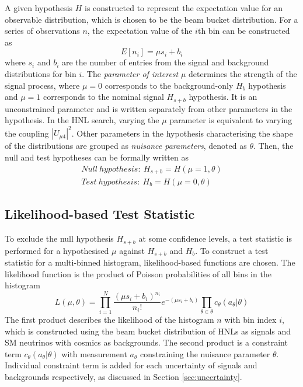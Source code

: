 A given hypothesis $H$ is constructed to represent the expectation value for an observable distribution, which is chosen to be the beam bucket distribution.
For a series of observations $n$, the expectation value of the $i$th bin can be constructed as 
\begin{equation}
    E[n_i] = \mu s_i + b_i    
\end{equation}
where $s_i$ and $b_i$ are the number of entries from the signal and background distributions for bin $i$.
The \textit{parameter of interest} $\mu$ determines the strength of the signal process, where $\mu = 0$ corresponds to the background-only $H_{b}$ hypothesis and $\mu = 1$ corresponds to the nominal signal $H_{s+b}$ hypothesis.
It is an unconstrained parameter and is written separately from other parameters in the hypothesis.
In the HNL search, varying the $\mu$ parameter is equivalent to varying the coupling $|U_{\mu4}|^{2}$.
Other parameters in the hypothesis characterising the shape of the distributions are grouped as \textit{nuisance parameters}, denoted as $\theta$.
Then, the null and test hypotheses can be formally written as
\begin{align}
    Null\ hypothesis:\ H_{s+b} = H (\mu = 1, \theta) \\
    Test\ hypothesis:\ H_{b} = H (\mu = 0, \theta)
\end{align}

\subsection{Likelihood-based Test Statistic}
\label{sec:llh_test}

To exclude the null hypothesis $H_{s+b}$ at some confidence levels, a test statistic is performed for a hypothesised $\mu$ against $H_{s+b}$ and $H_{b}$.
To construct a test statistic for a multi-binned histogram, likelihood-based functions are chosen.
The likelihood function is the product of Poisson probabilities of all bins in the histogram \cite{asymptotic_test}
\begin{equation}
\label{eq:LLH_func}
    L(\mu, \theta) =  \prod_{i=1}^{N} \frac{(\mu s_i + b_i)^{n_i}}{n_i!} e^{-(\mu s_i + b_i)}  \prod_{\theta\in\theta} c_\theta(a_\theta|\theta)
\end{equation}
The first product describes the likelihood of the histogram $n$ with bin index $i$, which is constructed using the beam bucket distribution of HNLs as signals and SM neutrinos with cosmics as backgrounds. 
The second product is a constraint term $c_\theta(a_\theta|\theta)$ with measurement $a_\theta$ constraining the nuisance parameter $\theta$.
Individual constraint term is added for each uncertainty of signals and backgrounds respectively, as discussed in Section \ref{sec:uncertainty}. 

